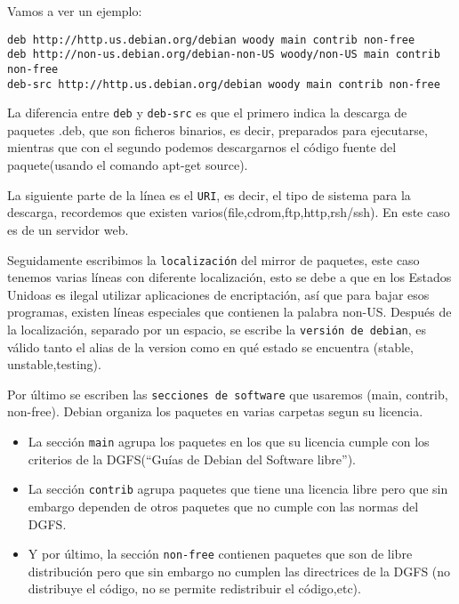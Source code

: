 Vamos a ver un ejemplo:

\begin{verbatim}
deb http://http.us.debian.org/debian woody main contrib non-free
deb http://non-us.debian.org/debian-non-US woody/non-US main contrib non-free
deb-src http://http.us.debian.org/debian woody main contrib non-free
\end{verbatim}

La  diferencia entre  {\tt  deb} y  {\tt deb-src}  es  que el  primero
indica la  descarga de  paquetes .deb, que  son ficheros  binarios, es
decir,  preparados  para  ejecutarse,  mientras  que  con  el  segundo
podemos descargarnos  el código  fuente del paquete(usando  el comando
apt-get  source).

La  siguiente  parte   de  la  línea  es  el  {\tt   URI},  es  decir,
el  tipo  de   sistema  para  la  descarga,   recordemos  que  existen
varios(file,cdrom,ftp,http,rsh/ssh). En  este caso  es de  un servidor
web.

Seguidamente escribimos la {\tt  localización} del mirror de paquetes,
este caso  tenemos varias líneas  con diferente localización,  esto se
debe  a que  en los  Estados Unidoas  es ilegal  utilizar aplicaciones
de  encriptación,   así  que   para  bajar  esos   programas,  existen
líneas  especiales que  contienen  la palabra  non-US.  Después de  la
localización, separado por  un espacio, se escribe la  {\tt versión de
debian}, es válido tanto el alias de  la version como en qué estado se
encuentra (stable, unstable,testing).

Por último  se escriben las  {\tt secciones de software}  que usaremos
(main,  contrib, non-free).  Debian  organiza los  paquetes en  varias
carpetas segun su licencia.

\begin{itemize}

\item La sección {\tt main} agrupa los paquetes en los que su licencia
cumple con  los criterios  de la DGFS(``Guías  de Debian  del Software
libre'').

\item La sección {\tt contrib}  agrupa paquetes que tiene una licencia
libre pero  que sin embargo dependen  de otros paquetes que  no cumple
con las normas del DGFS.

\item Y por  último, la sección {\tt non-free}  contienen paquetes que
son  de  libre  distribución  pero  que sin  embargo  no  cumplen  las
directrices  de  la  DGFS (no  distribuye  el  código,  no  se  permite
redistribuir el código,etc).

\end{itemize}

